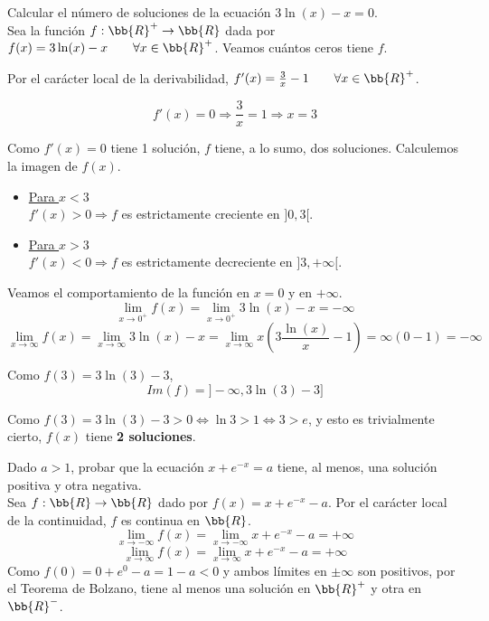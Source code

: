 \begin{ejercicio}
    Calcular el número de soluciones de la ecuación $3\ln(x)-x=0$.\\

    Sea la función $f:\bb{R}^+ \to \bb{R}$ dada por $f(x)=3\ln(x)-x \qquad \forall x\in \bb{R}^+$. Veamos cuántos ceros tiene $f$.
    
    Por el carácter local de la derivabilidad, $f'(x)=\frac{3}{x}-1 \qquad \forall x\in \bb{R}^+$.

    \begin{equation*}
        f'(x)=0 \Longrightarrow \frac{3}{x}=1 \Longrightarrow x=3 
    \end{equation*}

    Como $f'(x)=0$ tiene 1 solución, $f$ tiene, a lo sumo, dos soluciones. Calculemos la imagen de $f(x)$.
    \begin{itemize}
        \item \underline{Para $x<3$}\\
        $f'(x)>0 \Longrightarrow f$ es estrictamente creciente en $]0, 3[$.

        \item \underline{Para $x>3$}\\
        $f'(x)<0 \Longrightarrow f$ es estrictamente decreciente en $]3, +\infty[$.
    \end{itemize}

    Veamos el comportamiento de la función en $x=0$ y en $+\infty$.
    \begin{equation*}
        \lim_{x\to0^+}f(x) = \lim_{x\to0^+} 3\ln(x)-x = -\infty
    \end{equation*}
    \begin{equation*}
        \lim_{x\to\infty}f(x) = \lim_{x\to\infty} 3\ln(x)-x = \lim_{x\to\infty}x(3\frac{\ln(x)}{x}-1)  = \infty(0-1) = -\infty
    \end{equation*}

    Como $f(3)=3\ln(3)-3$, $$Im(f)=]-\infty, 3\ln(3)-3]$$

    Como $f(3)=3\ln(3)-3> 0 \Longleftrightarrow \ln{3}>1 \Longleftrightarrow 3 > e$, y esto es trivialmente cierto, $f(x)$ tiene \textbf{2 soluciones}.
\end{ejercicio}

\begin{ejercicio}
    Dado $a>1$, probar que la ecuación $x+e^{-x}=a$ tiene, al menos, una solución positiva y otra negativa.\\
    Sea $f:\bb{R} \to \bb{R}$ dado por $f(x)=x+e^{-x}-a$. Por el carácter local de la continuidad, $f$ es continua en $\bb{R}$.
    \begin{equation*}
        \lim_{x\to -\infty} f(x) = \lim_{x\to -\infty}x+e^{-x}-a = +\infty
    \end{equation*}
    \begin{equation*}
        \lim_{x\to \infty} f(x) = \lim_{x\to \infty}x+e^{-x}-a = +\infty
    \end{equation*}
    Como $f(0) = 0+e^0 -a = 1-a < 0$ y ambos límites en $\pm\infty$ son positivos, por el Teorema de Bolzano, tiene al menos una solución en $\bb{R}^+$ y otra en $\bb{R}^-$.
\end{ejercicio}

